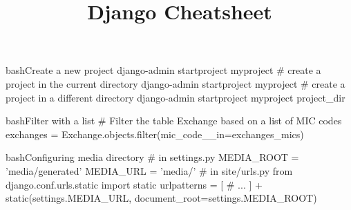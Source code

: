 \documentclass[10pt,a4paper]{article}
\title{\color{w3schools}Django Cheatsheet
}
\begin{document}
\maketitle
\small
\begin{multicols}{3}

\thispagestyle{empty}
\scriptsize

% 




\begin{codebox}{bash}{Create a new project}
django-admin startproject myproject
# create a project in the current directory
django-admin startproject myproject
# create a project in a different directory
django-admin startproject myproject project_dir

\end{codebox}

\begin{codebox}{bash}{Filter with a list}
# Filter the table Exchange based on a list of MIC codes
exchanges = Exchange.objects.filter(mic_code__in=exchanges_mics)

\end{codebox}


\begin{codebox}{bash}{Configuring media directory}
# in settings.py
MEDIA_ROOT = 'media/generated'
MEDIA_URL = 'media/'
# in site/urls.py
from django.conf.urls.static import static
urlpatterns = [
    # ...
] + static(settings.MEDIA_URL, document_root=settings.MEDIA_ROOT)


\end{codebox}
\end{multicols}
\end{document}
